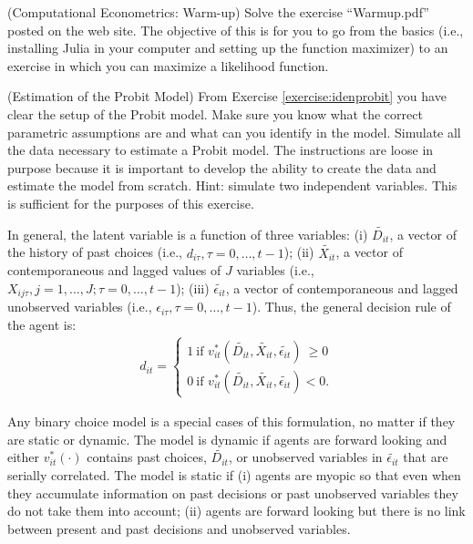 \begin{exercise} (Computational Econometrics: Warm-up)
Solve the exercise ``Warmup.pdf'' posted on the web site. The objective of this is for you to go from the basics (i.e., installing Julia in your computer and setting up the function maximizer) to an exercise in which you can maximize a likelihood function.
\end{exercise}

\begin{exercise} (Estimation of the Probit Model)
From Exercise \ref{exercise:idenprobit} you have clear the setup of the Probit model. Make sure you know what the correct parametric assumptions are and what can you identify in the model. Simulate all the data necessary to estimate a Probit model. The instructions are loose in purpose because it is important to develop the ability to create the data and estimate the model from scratch. Hint: simulate two independent variables. This is sufficient for the purposes of this exercise.
\end{exercise}

\indent In general, the latent variable is a function of three variables: (i) $\tilde{D_{it}}$, a vector of the history of past choices (i.e., $d_{i\tau}, \tau = 0, \ldots, t-1$); (ii) $\tilde{X_{it}}$, a vector of contemporaneous and lagged values of $J$ variables (i.e., $X_{ij\tau},  j = 1, \ldots, J; \tau = 0, \ldots, t-1$); (iii) $\tilde{\epsilon_{it}}$, a vector of contemporaneous and lagged  unobserved variables (i.e., $\epsilon_{i\tau}, \tau = 0, \ldots, t-1$). Thus, the general decision rule of the agent is:
\begin{eqnarray}
d_{it} =
\begin{cases}
1 \  \text{if }  v_{it}^* \left( \tilde{D_{it}}, \tilde{X_{it}}, \tilde{\epsilon_{it}} \right) \ \geq 0  \\
0 \  \text{if }  v_{it}^* \left( \tilde{D_{it}}, \tilde{X_{it}}, \tilde{\epsilon_{it}} \right)  < 0. \label{eq:latent}
\end{cases}
\end{eqnarray}

\indent Any binary choice model is a special cases of this formulation, no matter if they are static or dynamic. The model is dynamic if agents are forward looking and either $v_{it}^* (\cdot)$ contains past choices, $\tilde{D_{it}}$, or unobserved variables in $\tilde{\epsilon_{it}}$ that are serially correlated. The model is static if (i) agents are myopic so that even when they accumulate information on past decisions or past unobserved variables they do not take them into account; (ii) agents are forward looking but there is no link between present and past decisions and unobserved variables.

